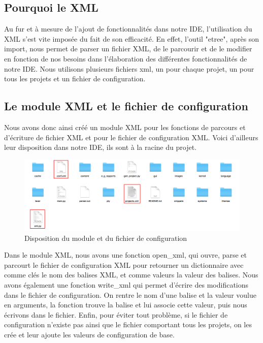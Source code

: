 \documentclass[a4paper,12pt]{article}
\begin{document}
\subsection{Pourquoi le XML}

Au fur et à mesure de l'ajout de fonctionnalités dans notre IDE, l'utilisation du XML s'est vite imposée du fait de son efficacité. En effet, l'outil "etree", après son import, nous permet de parser un fichier XML, de le parcourir et de le modifier en fonction de nos besoins dans l'élaboration des différentes fonctionnalités de notre IDE. Nous utilisons plusieurs fichiers xml, un pour chaque projet, un pour tous les projets et un fichier de configuration. 

\subsection{Le module XML et le fichier de configuration}

Nous avons donc ainsi créé un module XML pour les fonctions de parcours et d'écriture de fichier XML et pour le fichier de configuration XML. Voici d'ailleurs leur disposition dans notre IDE, ils sont à la racine du projet.

\begin{figure}[h!]
			\begin{center}
				\includegraphics[scale=0.23]{images/imgs_xml/dossier.png}
				\caption{Disposition du module et du fichier de configuration}
			\end{center}
		\end{figure}
		
Dans le module XML, nous avons une fonction open\_xml, qui ouvre, parse et parcourt le fichier de configuration XML pour retourner un dictionnaire avec comme clés le nom des balises XML, et comme valeurs la valeur des balises. Nous avons également une fonction write\_xml qui permet d'écrire des modifications dans le fichier de configuration. On rentre le nom d'une balise et la valeur voulue en arguments, la fonction trouve la balise et lui associe cette valeur, puis nous écrivons dans le fichier. Enfin, pour éviter tout problème, si le fichier de configuration n'existe pas ainsi que le fichier comportant tous les projets, on les crée et leur ajoute les valeurs de configuration de base. \\
		
\end{document}

